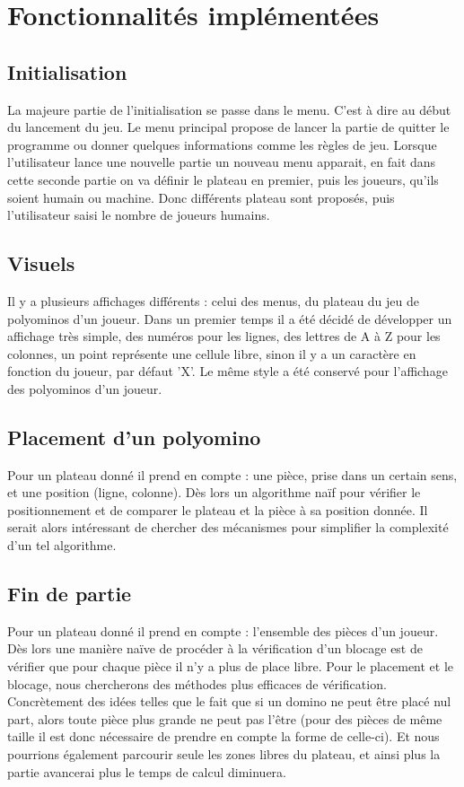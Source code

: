 \chapter{Fonctionnalités implémentées}

\section{Initialisation}

La majeure partie de l'initialisation se passe dans le menu. C'est à dire au début du lancement du jeu. Le menu principal propose de lancer la partie de quitter le programme ou donner quelques informations comme les règles de jeu. Lorsque l'utilisateur lance une nouvelle partie un nouveau menu apparait, en fait dans cette seconde partie on va définir le plateau en premier, puis les joueurs, qu'ils soient humain ou machine. Donc différents plateau sont proposés, puis l'utilisateur saisi le nombre de joueurs humains.

\section{Visuels}

Il y a plusieurs affichages différents : celui des menus, du plateau du jeu de polyominos d'un joueur.
Dans un premier temps il a été décidé de développer un affichage très simple, des numéros pour les lignes, des lettres de A à Z pour les colonnes, un point représente une cellule libre, sinon il y a un caractère en fonction du joueur, par défaut 'X'. Le même style a été conservé pour l'affichage des polyominos d'un joueur.

\section{Placement d'un polyomino}

Pour un plateau donné il prend en compte : une pièce, prise dans un certain sens, et une position (ligne, colonne). Dès lors un algorithme naïf pour vérifier le positionnement et de comparer le plateau et la pièce à sa position donnée. Il serait alors intéressant de chercher des mécanismes pour simplifier la complexité d'un tel algorithme.

\section{Fin de partie}

Pour un plateau donné il prend en compte : l’ensemble des pièces d’un joueur. Dès lors une manière naïve de procéder à la vérification d’un blocage est de vérifier que pour chaque pièce il n'y a plus de place libre.
Pour le placement et le blocage, nous chercherons des méthodes plus efficaces de vérification. Concrètement des idées telles que le fait que si un domino ne peut être placé nul part, alors toute pièce plus grande ne peut pas l’être (pour des pièces de même taille il est donc nécessaire de prendre en compte la forme de celle-ci). Et nous pourrions également parcourir seule les zones libres du plateau, et ainsi plus la partie avancerai plus le temps de calcul diminuera.

